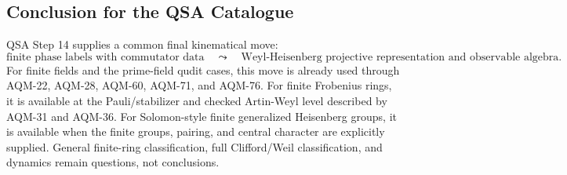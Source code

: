 \subsection{Conclusion for the QSA Catalogue}

QSA Step 14 supplies a common final kinematical move:
\[
  \text{finite phase labels with commutator data}
  \quad\leadsto\quad
  \text{Weyl-Heisenberg projective representation and observable algebra}.
\]
For finite fields and the prime-field qudit cases, this move is already used
through AQM-22, AQM-28, AQM-60, AQM-71, and AQM-76.  For finite Frobenius
rings, it is available at the Pauli/stabilizer and checked Artin-Weyl level
described by AQM-31 and AQM-36.  For Solomon-style finite generalized
Heisenberg groups, it is available when the finite groups, pairing, and
central character are explicitly supplied.  General finite-ring
classification, full Clifford/Weil classification, and dynamics remain
questions, not conclusions.
